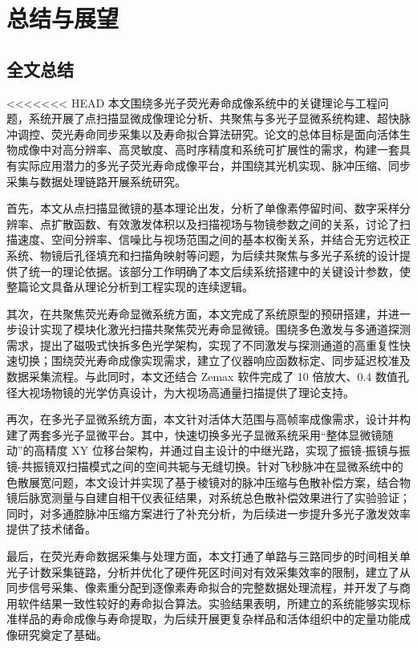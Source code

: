 \chapter{总结与展望}\label{Chap:7}

\section{全文总结}\label{7.1}

<<<<<<< HEAD
本文围绕多光子荧光寿命成像系统中的关键理论与工程问题，系统开展了点扫描显微成像理论分析、共聚焦与多光子显微系统构建、超快脉冲调控、荧光寿命同步采集以及寿命拟合算法研究。论文的总体目标是面向活体生物成像中对高分辨率、高灵敏度、高时序精度和系统可扩展性的需求，构建一套具有实际应用潜力的多光子荧光寿命成像平台，并围绕其光机实现、脉冲压缩、同步采集与数据处理链路开展系统研究。

首先，本文从点扫描显微镜的基本理论出发，分析了单像素停留时间、数字采样分辨率、点扩散函数、有效激发体积以及扫描视场与物镜参数之间的关系，讨论了扫描速度、空间分辨率、信噪比与视场范围之间的基本权衡关系，并结合无穷远校正系统、物镜后孔径填充和扫描角映射等问题，为后续共聚焦与多光子系统的设计提供了统一的理论依据。该部分工作明确了本文后续系统搭建中的关键设计参数，使整篇论文具备从理论分析到工程实现的连续逻辑。

其次，在共聚焦荧光寿命显微系统方面，本文完成了系统原型的预研搭建，并进一步设计实现了模块化激光扫描共聚焦荧光寿命显微镜。围绕多色激发与多通道探测需求，提出了磁吸式快拆多色光学架构，实现了不同激发与探测通道的高重复性快速切换；围绕荧光寿命成像实现需求，建立了仪器响应函数标定、同步延迟校准及数据采集流程。与此同时，本文还结合 Zemax 软件完成了 10 倍放大、0.4 数值孔径大视场物镜的光学仿真设计，为大视场高通量扫描提供了理论支持。

再次，在多光子显微系统方面，本文针对活体大范围与高帧率成像需求，设计并构建了两套多光子显微平台。其中，快速切换多光子显微系统采用“整体显微镜随动”的高精度 XY 位移台架构，并通过自主设计的中继光路，实现了振镜-振镜与振镜-共振镜双扫描模式之间的空间共轭与无缝切换。针对飞秒脉冲在显微系统中的色散展宽问题，本文设计并实现了基于棱镜对的脉冲压缩与色散补偿方案，结合物镜后脉宽测量与自建自相干仪表征结果，对系统总色散补偿效果进行了实验验证；同时，对多通腔脉冲压缩方案进行了补充分析，为后续进一步提升多光子激发效率提供了技术储备。

最后，在荧光寿命数据采集与处理方面，本文打通了单路与三路同步的时间相关单光子计数采集链路，分析并优化了硬件死区时间对有效采集效率的限制，建立了从同步信号采集、像素重分配到逐像素寿命拟合的完整数据处理流程，并开发了与商用软件结果一致性较好的寿命拟合算法。实验结果表明，所建立的系统能够实现标准样品的寿命成像与寿命提取，为后续开展更复杂样品和活体组织中的定量功能成像研究奠定了基础。

